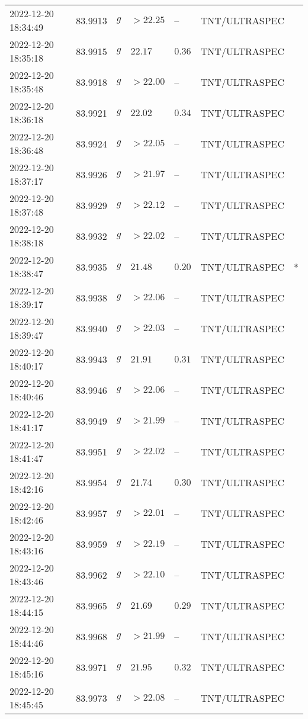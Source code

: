 \documentclass{nature_plusfigure}
\begin{document}
\begin{supplement}
\begin{center}
\begin{longtable}{lllllll}
2022-12-20 18:34:49 & 83.9913 & $g$ & $>22.25$ & -- & TNT/ULTRASPEC &  \\ 
2022-12-20 18:35:18 & 83.9915 & $g$ & $22.17$ & $0.36$ & TNT/ULTRASPEC &  \\ 
2022-12-20 18:35:48 & 83.9918 & $g$ & $>22.00$ & -- & TNT/ULTRASPEC &  \\ 
2022-12-20 18:36:18 & 83.9921 & $g$ & $22.02$ & $0.34$ & TNT/ULTRASPEC &  \\ 
2022-12-20 18:36:48 & 83.9924 & $g$ & $>22.05$ & -- & TNT/ULTRASPEC &  \\ 
2022-12-20 18:37:17 & 83.9926 & $g$ & $>21.97$ & -- & TNT/ULTRASPEC &  \\ 
2022-12-20 18:37:48 & 83.9929 & $g$ & $>22.12$ & -- & TNT/ULTRASPEC &  \\ 
2022-12-20 18:38:18 & 83.9932 & $g$ & $>22.02$ & -- & TNT/ULTRASPEC &  \\ 
2022-12-20 18:38:47 & 83.9935 & $g$ & $21.48$ & $0.20$ & TNT/ULTRASPEC & * \\ 
2022-12-20 18:39:17 & 83.9938 & $g$ & $>22.06$ & -- & TNT/ULTRASPEC &  \\ 
2022-12-20 18:39:47 & 83.9940 & $g$ & $>22.03$ & -- & TNT/ULTRASPEC &  \\ 
2022-12-20 18:40:17 & 83.9943 & $g$ & $21.91$ & $0.31$ & TNT/ULTRASPEC &  \\ 
2022-12-20 18:40:46 & 83.9946 & $g$ & $>22.06$ & -- & TNT/ULTRASPEC &  \\ 
2022-12-20 18:41:17 & 83.9949 & $g$ & $>21.99$ & -- & TNT/ULTRASPEC &  \\ 
2022-12-20 18:41:47 & 83.9951 & $g$ & $>22.02$ & -- & TNT/ULTRASPEC &  \\ 
2022-12-20 18:42:16 & 83.9954 & $g$ & $21.74$ & $0.30$ & TNT/ULTRASPEC &  \\ 
2022-12-20 18:42:46 & 83.9957 & $g$ & $>22.01$ & -- & TNT/ULTRASPEC &  \\ 
2022-12-20 18:43:16 & 83.9959 & $g$ & $>22.19$ & -- & TNT/ULTRASPEC &  \\ 
2022-12-20 18:43:46 & 83.9962 & $g$ & $>22.10$ & -- & TNT/ULTRASPEC &  \\ 
2022-12-20 18:44:15 & 83.9965 & $g$ & $21.69$ & $0.29$ & TNT/ULTRASPEC &  \\ 
2022-12-20 18:44:46 & 83.9968 & $g$ & $>21.99$ & -- & TNT/ULTRASPEC &  \\ 
2022-12-20 18:45:16 & 83.9971 & $g$ & $21.95$ & $0.32$ & TNT/ULTRASPEC &  \\ 
2022-12-20 18:45:45 & 83.9973 & $g$ & $>22.08$ & -- & TNT/ULTRASPEC &  \\ 

\end{longtable}
\end{center}
\end{supplement}
\end{document}
